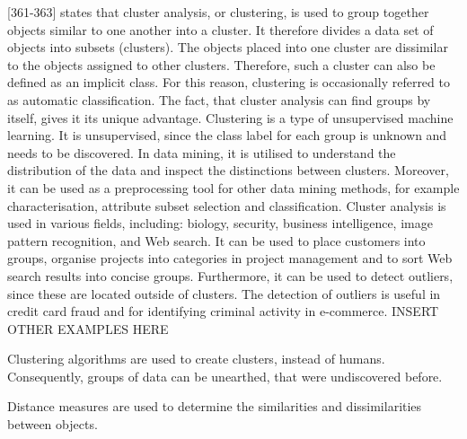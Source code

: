 \textcite{han2011data}[361-363] states that cluster analysis, or clustering, is used to group together objects similar to one another into a cluster. It therefore divides a data set of objects into subsets (clusters). The objects placed into one cluster are dissimilar to the objects assigned to other clusters. Therefore, such a cluster can also be defined as an implicit class. For this reason, clustering is occasionally referred to as automatic classification. The fact, that cluster analysis can find groups by itself, gives it its unique advantage. Clustering is a type of unsupervised machine learning. It is unsupervised, since the class label for each group is unknown and needs to be discovered. In data mining, it is utilised to understand the distribution of the data and inspect the distinctions between clusters. Moreover, it can be used as a preprocessing tool for other data mining methods, for example characterisation, attribute subset selection and classification.
Cluster analysis is used in various fields, including: biology, security, business intelligence, image pattern recognition, and Web search. It can be used to place customers into groups, organise projects into categories in project management and to sort Web search results into concise groups. Furthermore, it can be used to detect outliers, since these are located outside of clusters. The detection of outliers is useful in credit card fraud and for identifying criminal activity in e-commerce. 
INSERT OTHER EXAMPLES HERE






Clustering algorithms are used to create clusters, instead of humans. Consequently, groups of data can be unearthed, that were undiscovered before.

Distance measures are used to determine the similarities and dissimilarities between objects. 



